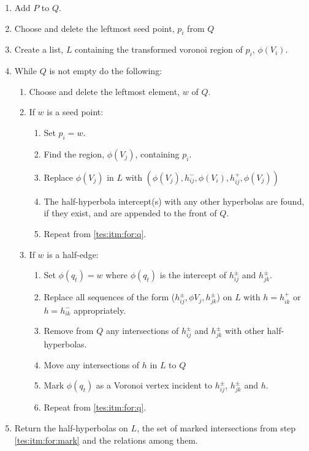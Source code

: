 \begin{enumerate}
  \item Add $P$ to $Q$.
  \item Choose and delete the leftmost seed point, $p_i$ from $Q$
  \item Create a list, $L$ containing the transformed voronoi region of $p_i$, $\phi(V_i)$.
  \item\label{tes:itm:for:q} While $Q$ is not empty do the following:
  \begin{enumerate}
    \item Choose and delete the leftmost element, $w$ of $Q$.
    \item If $w$ is a seed point:
    \begin{enumerate}
      \item Set $p_i=w$.
      \item Find the region, $\phi(V_j)$, containing $p_i$.
      \item Replace $\phi(V_j)$ in $L$ with $(\phi(V_j),h^-_{ij},\phi(V_i),h^+_{ij},\phi(V_j))$
      \item The half-hyperbola intercept(s) with any other hyperbolas are found, if they exist, and are appended to the front of $Q$.
      \item Repeat from \ref{tes:itm:for:q}.
    \end{enumerate}
    \item If $w$ is a half-edge:
    \begin{enumerate}
      \item Set $\phi(q_t)=w$ where $\phi(q_t)$ is the intercept of $h^\pm_{ij}$ and $h^\pm_{jk}$.
      \item Replace all sequences of the form ($h^\pm_{ij},\phi{V_j},h^\pm_{jk}$) on $L$ with $h=h^+_{ik}$ or $h=h^-_{ik}$ appropriately.
      \item Remove from $Q$ any intersections of $h^\pm_{ij}$ and $h^\pm_{jk}$ with other half-hyperbolas.
      \item Move any intersections of $h$ in $L$ to $Q$
      \item\label{tes:itm:for:mark} Mark $\phi(q_t)$ as a Voronoi vertex incident to $h^\pm_{ij}$, $h^\pm_{jk}$ and $h$.
      \item Repeat from \ref{tes:itm:for:q}.
    \end{enumerate}
  \end{enumerate}
  \item Return the half-hyperbolas on $L$, the set of marked intersections from step \ref{tes:itm:for:mark} and the relations among them.
\end{enumerate}
